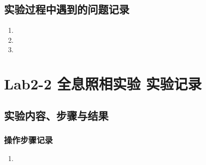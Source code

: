 \documentclass[dvipsnames, svgnames,a4paper,11pt]{article}
\begin{document}
	\newpage
	
	\null
	
	\newpage
	
	\null
	
	
	
	
	
	
	\newpage
	
	\subsection{实验过程中遇到的问题记录}
	
	\begin{enumerate}
		\item 
		\item 
		\item 
	\end{enumerate}
	\null
	
	
	
	
	
	
	
	
	\section{Lab2-2 全息照相实验  \quad\heiti 实验记录}
	
	\subsection{实验内容、步骤与结果}
	
	\subsubsection{操作步骤记录}
	\begin{enumerate}
		\item 
	\end{enumerate}	
	
\end{document}
